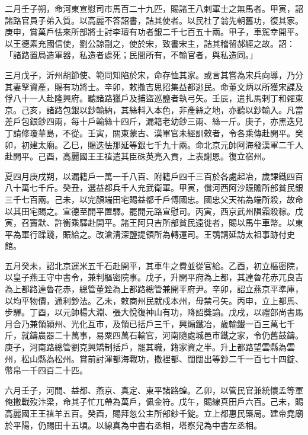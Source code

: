 \begin{pinyinscope}
 二月壬子朔，命河東宣慰司市馬百二十九匹，賜諸王八剌軍士之無馬者。甲寅，詔諸路官員子弟入質。以高麗不答詔書，詰其使者。以民杜了翁先朝舊功，復其家。庚申，賞萬戶怯來所部將士討李璮有功者銀二千七百五十兩。甲子，車駕幸開平。以王德素充國信使，劉公諒副之，使於宋，致書宋主，詰其稽留郝經之故。詔：「諸路置局造軍器，私造者處死；民間所有，不輸官者，與私造同。」



 三月戊子，沂州胡節使、範同知陷於宋，命存恤其家。或言其嘗為宋兵向導，乃分其妻孥資產，賜有功將士。辛卯，敕撒吉思招集益都逃民。命董文炳以所獲宋諜及俘八十一人赴隆興府。聽諸路獵戶及捕盜巡鹽者執弓矢。壬辰，遣扎馬剌丁和糴東京。己亥，諸路包銀以鈔輸納，其絲料入本色，非產絲之地，亦聽以鈔輸入。凡當差戶包銀鈔四兩，每十戶輸絲十四斤，漏籍老幼鈔三兩、絲一斤。庚子，亦黑迭兒丁請修瓊華島，不從。壬寅，關東蒙古、漢軍官未經訓敕者，令各乘傳赴開平。癸卯，初建太廟。乙巳，賜迭怯那延等銀七千九十兩。命北京元帥阿海發漢軍二千人赴開平。己酉，高麗國王王禃遣其臣硃英亮入貢，上表謝恩。復立宿州。



 夏四月庚戌朔，以漏籍戶一萬一千八百、附籍戶四千三百於各處起冶，歲課鐵四百八十萬七千斤。癸丑，選益都兵千人充武衛軍。甲寅，償河西阿沙賑贍所部貧民銀三千七百兩。己未，以完顏端田宅賜益都千戶傅國忠。國忠父天祐為端所殺，故命以其田宅賜之。宣德至開平置驛。罷開元路宣慰司。丙寅，西京武州隕霜殺稼。戊寅，召竇默、許衡乘驛赴開平。諸王阿只吉所部貧民遠徙者，賜以馬牛車幣。以東平為軍行蹂踐，賑給之。改滄清深鹽提領所為轉運司。王鶚請延訪太祖事跡付史館。



 五月癸未，詔北京運米五千石赴開平，其車牛之費並從官給。乙酉，初立樞密院，以皇子燕王守中書令，兼判樞密院事。戊子，升開平府為上都，其達魯花赤兀良吉為上都路達魯花赤，總管董銓為上都路總管兼開平府尹。辛卯，詔立燕京平準庫，以均平物價，通利鈔法。乙未，敕商州民就戍本州，毋禁弓矢。丙申，立上都馬、步驛。丁酉，以元帥楊大淵、張大悅復神山有功，降詔獎諭。戊戌，以禮部尚書馬月合乃兼領潁州、光化互市，及領已括戶三千，興煽鐵冶，歲輸鐵一百三萬七千斤，就鑄農器二十萬事，易粟四萬石輸官，河南隨處城邑市鐵之家，令仍舊鼓鑄。庚子，河南路總管劉克興矯制括戶，罷其職，籍家資之半。升上都路望雲縣為雲州，松山縣為松州。賞前討渾都海戰功，撒裡都、闊闊出等鈔二千一百七十四錠、幣帛一千四百二十匹。



 六月壬子，河間、益都、燕京、真定、東平諸路蝗。乙卯，以管民官兼統懷孟等軍俺撒戰歿汴梁，命其子忙兀帶為萬戶，佩金符。戊午，賜線真田戶六百。己未，賜高麗國王王禃羊五百。癸酉，賜拜忽公主所部鈔千錠。立上都惠民藥局。建帝堯廟於平陽，仍賜田十五頃。以線真為中書右丞相，塔察兒為中書左丞相。




\end{pinyinscope}
